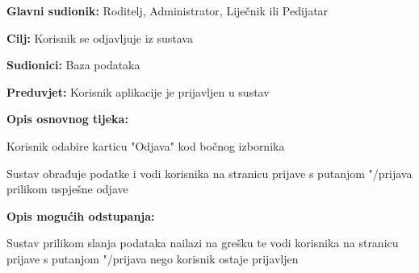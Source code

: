 					
					
					
					\noindent {}
					\begin{packed_item}
						
						\item \textbf{Glavni sudionik: }Roditelj, Administrator, Liječnik ili Pedijatar
						\item  \textbf{Cilj:} Korisnik se odjavljuje iz sustava
						\item  \textbf{Sudionici:} Baza podataka
						\item  \textbf{Preduvjet:} Korisnik aplikacije je prijavljen u sustav
						\item  \textbf{Opis osnovnog tijeka:}
						
						\item[] \begin{packed_enum}
							
							\item Korisnik odabire karticu "Odjava" kod bočnog izbornika
							\item Sustav obrađuje podatke i vodi korisnika na stranicu prijave s putanjom "/prijava prilikom uspješne odjave
						\end{packed_enum}
						
						\item  \textbf{Opis mogućih odstupanja:}
						
						\item[] \begin{packed_item}
							\item[2.a] Sustav prilikom slanja podataka nailazi na grešku te vodi korisnika na stranicu prijave s putanjom "/prijava nego korisnik ostaje prijavljen
						\end{packed_item}
						
					\end{packed_item}
					

